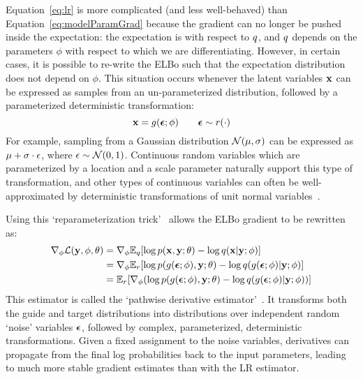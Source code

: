 Equation~\ref{eq:lr} is more complicated (and less well-behaved) than Equation~\ref{eq:modelParamGrad} because the gradient can no longer be pushed inside the expectation: the expectation is with respect to $q$, and $q$ depends on the parameters $\phi$ with respect to which we are differentiating.
However, in certain cases, it is possible to re-write the ELBo such that the expectation distribution does not depend on $\phi$.
This situation occurs whenever the latent variables $\mathbf{x}$ can be expressed as samples from an un-parameterized distribution, followed by a parameterized deterministic transformation:
\begin{equation*}
\mathbf{x} = g(\bm{\epsilon} ; \phi) \hspace{2em} \bm{\epsilon} \sim r(\cdot)
\end{equation*}
For example, sampling from a Gaussian distribution $\mathcal{N}(\mu, \sigma)$ can be expressed as $\mu + \sigma \cdot \epsilon$, where $\epsilon \sim \mathcal{N}(0, 1)$. Continuous random variables which are parameterized by a location and a scale parameter naturally support this type of transformation, and other types of continuous variables can often be well-approximated by deterministic transformations of unit normal variables~\cite{ADVI}.

Using this `reparameterization trick'~\cite{AEVB} allows the ELBo gradient to be rewritten as:
\begin{align}
\begin{split}
\nabla_\phi \mathcal{L}(\mathbf{y}, \phi, \theta)
&= \nabla_\phi \mathbb{E}_{q}[ \log p(\mathbf{x}, \mathbf{y}; \theta) - \log q(\mathbf{x} | \mathbf{y} ; \phi) ]\\
&= \nabla_\phi \mathbb{E}_{r} [ \log p(g(\bm{\epsilon} ; \phi), \mathbf{y} ; \theta) - \log q(g(\bm{\epsilon} ; \phi) | \mathbf{y} ; \phi) ]\\
&= \mathbb{E}_{r} [\nabla_\phi ( \log p(g(\bm{\epsilon} ; \phi), \mathbf{y} ; \theta) - \log q(g(\bm{\epsilon} ; \phi) | \mathbf{y} ; \phi) ) ]
\end{split}
\label{eq:pw}
\end{align}
This estimator is called the `pathwise derivative estimator'~\cite{PathwiseEstimator}.
It transforms both the guide and target distributions into distributions over independent random `noise' variables $\bm{\epsilon}$, followed by complex, parameterized, deterministic transformations. Given a fixed assignment to the noise variables, derivatives can propagate from the final log probabilities back to the input parameters, leading to much more stable gradient estimates than with the LR estimator.

